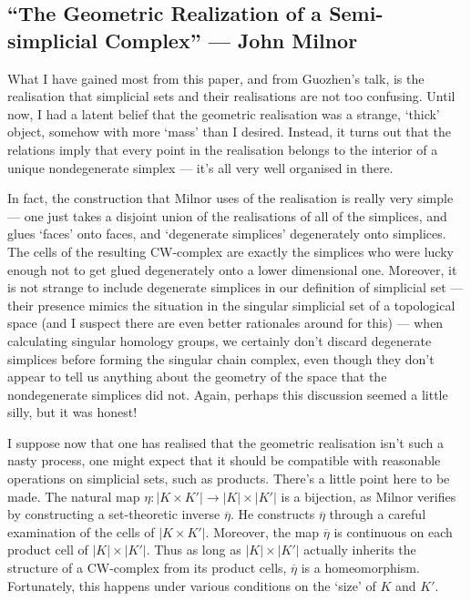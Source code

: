 \documentclass[11pt]{article}
\newcommand{\KanSemResponse}[1]
{
\thispagestyle{fancy}
\subsection*{#1}
}
\begin{document}
\begin{CharacteristicClasses}



\pagebreak
\end{CharacteristicClasses}
\begin{MilnorGeometricRealization}
\KanSemResponse
{``The Geometric Realization of a Semi-simplicial Complex'' --- John Milnor}
What I have gained most from this paper, and from Guozhen's talk, is the realisation that simplicial sets and their realisations are not too confusing. Until now, I had a latent belief that the geometric realisation was a strange, `thick' object, somehow with more `mass' than I desired. Instead, it turns out that the relations imply that every point in the realisation belongs to the interior of a unique nondegenerate simplex --- it's all very well organised in there.

In fact, the construction that Milnor uses of the realisation is really very simple --- one just takes a disjoint union of the realisations of all of the simplices, and glues `faces' onto faces, and `degenerate simplices' degenerately onto simplices. The cells of the resulting CW-complex are exactly the simplices who were lucky enough not to get glued degenerately onto a lower dimensional one. Moreover, it is not strange to include degenerate simplices in our definition of simplicial set --- their presence mimics the situation in the singular simplicial set of a topological space (and I suspect there are even better rationales around for this) --- when calculating singular homology groups, we certainly don't discard degenerate simplices before forming the singular chain complex, even though they don't appear to tell us anything about the geometry of the space that the nondegenerate simplices did not. Again, perhaps this discussion seemed a little silly, but it was honest!

I suppose now that one has realised that the geometric realisation isn't such a nasty process, one might expect that it should be compatible with reasonable operations on simplicial sets, such as products. There's a little point here to be made. The natural map $\eta:|K\times K'|\to|K|\times|K'|$ is a bijection, as Milnor verifies by constructing a set-theoretic inverse $\overline\eta$. He constructs $\overline\eta$ through a careful examination of the cells of $|K\times K'|$. Moreover, the map $\overline\eta$ is continuous on each product cell of $|K|\times|K'|$. Thus as long as $|K|\times|K'|$ actually inherits the structure of a CW-complex from its product cells, $\overline\eta$ is a homeomorphism. Fortunately, this happens under various conditions on the `size' of $K$ and $K'$.


\end{MilnorGeometricRealization}
\end{document}
